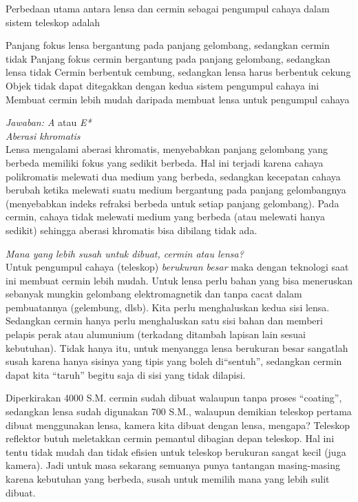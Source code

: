 \documentclass[11pt,fleqn, a4paper]{exam}
\begin{document}
\begin{questions}
\question Perbedaan utama antara lensa dan cermin sebagai pengumpul cahaya dalam sistem teleskop adalah
\begin{choices}
\choice Panjang fokus lensa bergantung pada panjang gelombang, sedangkan cermin tidak
\choice Panjang fokus cermin bergantung pada panjang gelombang, sedangkan lensa tidak
\choice Cermin berbentuk cembung, sedangkan lensa harus berbentuk cekung
\choice Objek tidak dapat ditegakkan dengan kedua sistem pengumpul cahaya ini
\choice Membuat cermin lebih mudah daripada membuat lensa untuk pengumpul cahaya
\end{choices}

\textit{Jawaban: A} atau \textit{E*}\\
\textit{Aberasi khromatis}\\
Lensa mengalami aberasi khromatis, menyebabkan panjang gelombang yang berbeda memiliki fokus yang sedikit berbeda. Hal ini terjadi karena cahaya polikromatis melewati dua medium yang berbeda, sedangkan kecepatan cahaya berubah ketika melewati suatu medium bergantung pada panjang gelombangnya (menyebabkan indeks refraksi berbeda untuk setiap panjang gelombang). Pada cermin, cahaya tidak melewati medium yang berbeda (atau melewati hanya sedikit) sehingga aberasi khromatis bisa dibilang tidak ada.

\textit{Mana yang lebih susah untuk dibuat, cermin atau lensa?} \\
Untuk pengumpul cahaya (teleskop) \textit{berukuran besar} maka dengan teknologi saat ini membuat cermin lebih mudah. Untuk lensa perlu bahan yang bisa meneruskan sebanyak mungkin gelombang elektromagnetik dan tanpa cacat dalam pembuatannya (gelembung, dlsb). Kita perlu menghaluskan kedua sisi lensa. Sedangkan cermin hanya perlu menghaluskan satu sisi bahan dan memberi pelapis perak atau alumunium (terkadang ditambah lapisan lain sesuai kebutuhan). Tidak hanya itu, untuk menyangga lensa berukuran besar sangatlah susah karena hanya sisinya yang tipis yang boleh di``sentuh'', sedangkan cermin dapat kita ``taruh'' begitu saja di sisi yang tidak dilapisi. 

Diperkirakan 4000 S.M. cermin sudah dibuat walaupun tanpa proses ``coating'', sedangkan lensa sudah digunakan 700 S.M., walaupun demikian teleskop  pertama dibuat menggunakan lensa, kamera kita dibuat dengan lensa, mengapa? 
Teleskop reflektor butuh meletakkan cermin pemantul dibagian depan teleskop.  Hal ini tentu tidak mudah dan tidak efisien untuk teleskop berukuran sangat kecil (juga kamera). Jadi untuk masa sekarang semuanya punya tantangan masing-masing karena kebutuhan yang berbeda, susah untuk memilih mana yang lebih sulit dibuat.



\end{questions}
\end{document}
